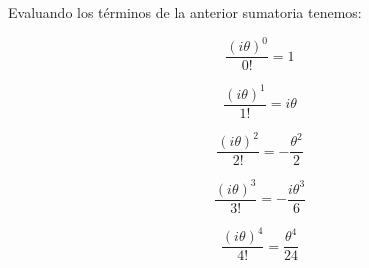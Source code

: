 \documentclass[preview]{standalone}
\begin{document}
\begin{center}
Evaluando los términos de la anterior sumatoria tenemos:


$$ \frac{(i\theta)^0}{0!} = 1 $$


$$ \frac{(i\theta)^1}{1!} = i\theta $$


$$ \frac{(i\theta)^2}{2!} = -\frac{\theta^2}{2} $$


$$ \frac{(i\theta)^3}{3!} = -\frac{i\theta^3}{6} $$


$$ \frac{(i\theta)^4}{4!} = \frac{\theta^4}{24} $$
\end{center}
\end{document}
